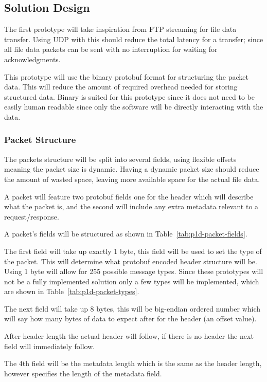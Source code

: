 \subsection*{Solution Design}
The first prototype will take inspiration from FTP streaming for file data transfer. Using UDP with this should reduce the total latency for a transfer; since all file data packets can be sent with no interruption for waiting for acknowledgments.

This prototype will use the binary protobuf format for structuring the packet data. This will reduce the amount of required overhead needed for storing structured data. Binary is suited for this prototype since it does not need to be easily human readable since only the software will be directly interacting with the data.

\subsubsection*{Packet Structure}
The packets structure will be split into several fields, using flexible offsets meaning the packet size is dynamic. Having a dynamic packet size should reduce the amount of wasted space, leaving more available space for the actual file data.

A packet will feature two protobuf fields one for the header which will describe what the packet is, and the second will include any extra metadata relevant to a request/response.

A packet's fields will be structured as shown in Table~\ref{tab:p1d-packet-fields}.

The first field will take up exactly 1 byte, this field will be used to set the type of the packet. This will determine what protobuf encoded header structure will be. Using 1 byte will allow for 255 possible message types. Since these prototypes will not be a fully implemented solution only a few types will be implemented, which are shown in Table~\ref{tab:p1d-packet-types}.

The next field will take up 8 bytes, this will be big-endian ordered number which will say how many bytes of data to expect after for the header (an offset value).

After header length the actual header will follow, if there is no header the next field will immediately follow.

The 4th field will be the metadata length which is the same as the header length, however specifies the length of the metadata field.

